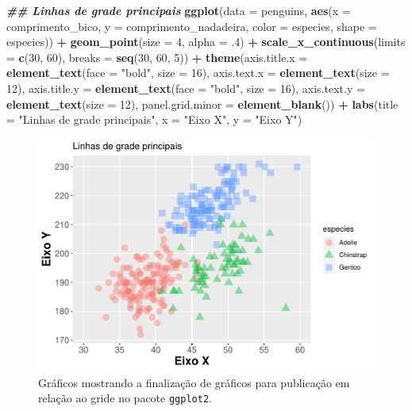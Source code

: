 \documentclass[
]{article}
\newenvironment{Shaded}{\begin{snugshade}}{\end{snugshade}}
\newcommand{\AttributeTok}[1]{\textcolor[rgb]{0.13,0.29,0.53}{#1}}
\newcommand{\DecValTok}[1]{\textcolor[rgb]{0.00,0.00,0.81}{#1}}
\newcommand{\DocumentationTok}[1]{\textcolor[rgb]{0.56,0.35,0.01}{\textbf{\textit{#1}}}}
\newcommand{\FunctionTok}[1]{\textcolor[rgb]{0.13,0.29,0.53}{\textbf{#1}}}
\newcommand{\NormalTok}[1]{#1}
\newcommand{\SpecialCharTok}[1]{\textcolor[rgb]{0.81,0.36,0.00}{\textbf{#1}}}
\newcommand{\StringTok}[1]{\textcolor[rgb]{0.31,0.60,0.02}{#1}}
\begin{document}
\begin{Shaded}
\begin{Highlighting}[]
\DocumentationTok{\#\# Linhas de grade principais}
\FunctionTok{ggplot}\NormalTok{(}\AttributeTok{data =}\NormalTok{ penguins, }
       \FunctionTok{aes}\NormalTok{(}\AttributeTok{x =}\NormalTok{ comprimento\_bico, }\AttributeTok{y =}\NormalTok{ comprimento\_nadadeira,}
           \AttributeTok{color =}\NormalTok{ especies, }\AttributeTok{shape =}\NormalTok{ especies)) }\SpecialCharTok{+}
    \FunctionTok{geom\_point}\NormalTok{(}\AttributeTok{size =} \DecValTok{4}\NormalTok{, }\AttributeTok{alpha =}\NormalTok{ .}\DecValTok{4}\NormalTok{) }\SpecialCharTok{+}
    \FunctionTok{scale\_x\_continuous}\NormalTok{(}\AttributeTok{limits =} \FunctionTok{c}\NormalTok{(}\DecValTok{30}\NormalTok{, }\DecValTok{60}\NormalTok{), }\AttributeTok{breaks =} \FunctionTok{seq}\NormalTok{(}\DecValTok{30}\NormalTok{, }\DecValTok{60}\NormalTok{, }\DecValTok{5}\NormalTok{)) }\SpecialCharTok{+}
    \FunctionTok{theme}\NormalTok{(}\AttributeTok{axis.title.x =} \FunctionTok{element\_text}\NormalTok{(}\AttributeTok{face =} \StringTok{"bold"}\NormalTok{, }\AttributeTok{size =} \DecValTok{16}\NormalTok{),}
          \AttributeTok{axis.text.x =} \FunctionTok{element\_text}\NormalTok{(}\AttributeTok{size =} \DecValTok{12}\NormalTok{),}
          \AttributeTok{axis.title.y =} \FunctionTok{element\_text}\NormalTok{(}\AttributeTok{face =} \StringTok{"bold"}\NormalTok{, }\AttributeTok{size =} \DecValTok{16}\NormalTok{),}
          \AttributeTok{axis.text.y =} \FunctionTok{element\_text}\NormalTok{(}\AttributeTok{size =} \DecValTok{12}\NormalTok{),}
          \AttributeTok{panel.grid.minor =} \FunctionTok{element\_blank}\NormalTok{()) }\SpecialCharTok{+}
    \FunctionTok{labs}\NormalTok{(}\AttributeTok{title =} \StringTok{"Linhas de grade principais"}\NormalTok{, }\AttributeTok{x =} \StringTok{"Eixo X"}\NormalTok{, }\AttributeTok{y =} \StringTok{"Eixo Y"}\NormalTok{)}
\end{Highlighting}
\end{Shaded}

\begin{figure}
\centering
\includegraphics{epr_files/figure-latex/fig-plot-final-gride-1.pdf}
\caption{\label{fig:fig-plot-final-gride-1}Gráficos mostrando a finalização de gráficos para publicação em relação ao gride no pacote \texttt{ggplot2}.}
\end{figure}
\end{document}

